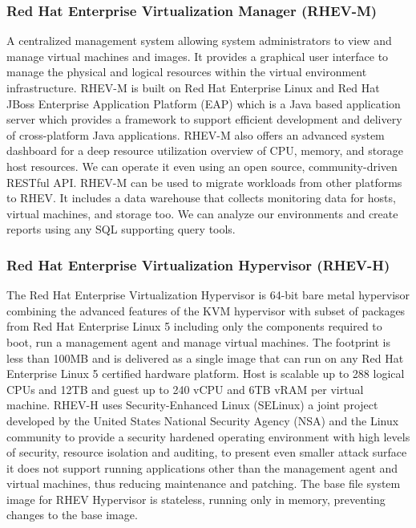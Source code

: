 \subsubsection{Red Hat Enterprise Virtualization Manager (RHEV-M)}
A centralized management system allowing system administrators to view and manage virtual machines and images. It provides a graphical user interface to manage the physical and logical resources within the virtual environment infrastructure. RHEV-M is built on Red Hat Enterprise Linux and Red Hat JBoss Enterprise Application Platform (EAP) which is a Java based application server which provides a framework to support efficient development and delivery of cross-platform Java applications. RHEV-M also offers an advanced system dashboard for a deep resource utilization overview of CPU, memory, and storage host resources. We can operate it even using an open source, community-driven RESTful API. RHEV-M can be used to migrate workloads from other platforms to RHEV. It includes a data warehouse that collects monitoring data for hosts, virtual machines, and storage too. We can analyze our environments and create reports using any SQL supporting query tools.


\subsubsection{Red Hat Enterprise Virtualization Hypervisor (RHEV-H)}
The Red Hat Enterprise Virtualization Hypervisor is 64-bit bare metal hypervisor combining the advanced features of the KVM hypervisor with subset of packages from Red Hat Enterprise Linux 5 including only the components required to boot, run a management agent and manage virtual machines. The footprint is less than 100MB and is delivered as a single image that can run on any Red Hat Enterprise Linux 5 certified hardware platform. Host is scalable up to 288 logical CPUs and 12TB and guest up to 240 vCPU and 6TB vRAM per virtual machine. RHEV-H uses Security-Enhanced Linux (SELinux) a joint project developed by the United States National Security Agency (NSA) and the Linux community to provide a security hardened operating environment with high levels of security, resource isolation and auditing, to present even smaller attack surface it does not support running applications other than the management agent and virtual machines, thus reducing maintenance and patching. The base file system image for RHEV Hypervisor is stateless, running only in memory, preventing changes to the base image.


